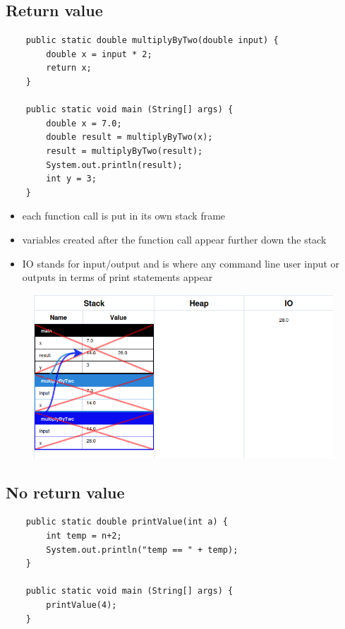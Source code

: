 \documentclass{article}
\begin{document}
\subsection{Return value}

\begin{verbatim}
	public static double multiplyByTwo(double input) {
	    double x = input * 2;
	    return x;
	}

	public static void main (String[] args) {
	    double x = 7.0;
	    double result = multiplyByTwo(x);
	    result = multiplyByTwo(result);
	    System.out.println(result);
	    int y = 3;
	}
\end{verbatim}

\begin{itemize}
	\item each function call is put in its own stack frame
	\item variables created after the function call appear further down the stack
	\item IO stands for input/output and is where any command line user input or
	outputs in terms of print statements appear
\end{itemize}

\begin{figure}[H]
	\centering
	\includegraphics{functionReturn.png}
\end{figure}

\pagebreak

\subsection{No return value}

\begin{verbatim}
	public static double printValue(int a) {
	    int temp = n+2;
	    System.out.println("temp == " + temp);
	}

	public static void main (String[] args) {
	    printValue(4);
	}
\end{verbatim}
\end{document}
